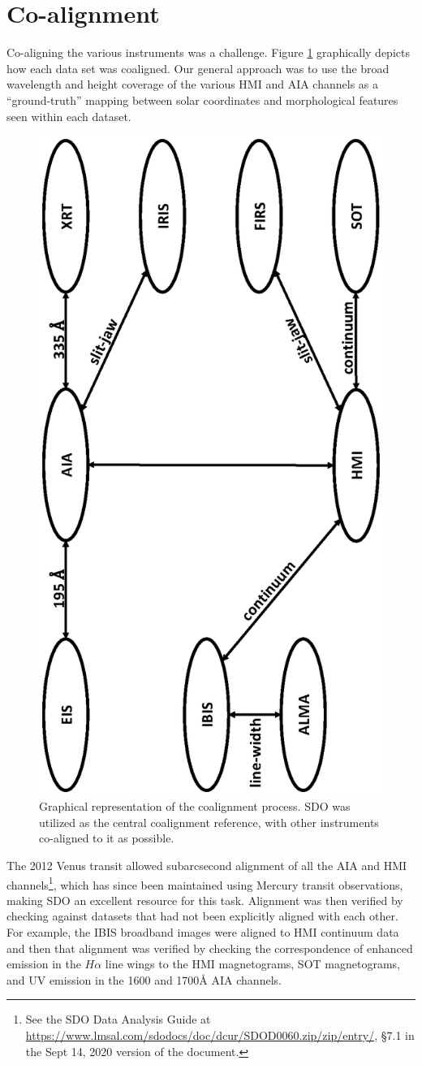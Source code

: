 \documentclass[twocolumn]{aastex62}
\newcommand{\figref}[1]{Figure \ref{#1}}
\newcommand{\halpha}{\ensuremath{H\alpha}}
\begin{document}
\section{Co-alignment} \label{sec:coalign}
Co-aligning the various instruments was a challenge.  \figref{fig:coalign} graphically depicts how each data set was coaligned.
Our general approach was to use the broad wavelength and height coverage of the various HMI and AIA channels as a ``ground-truth'' mapping between solar coordinates and morphological features seen within each dataset.  
\begin{figure}[b]
\centering
\includegraphics[trim=200 100 100 100, clip, width=0.5\linewidth, angle=270]{figures/co-alignment.eps}
\caption{Graphical representation of the coalignment process. SDO was utilized as the central coalignment reference, with other instruments co-aligned to it as possible. }\label{fig:coalign}
\end{figure}
The 2012 Venus transit allowed subarcsecond alignment of all the AIA and HMI channels\footnote{See the SDO Data Analysis Guide at \url{https://www.lmsal.com/sdodocs/doc/dcur/SDOD0060.zip/zip/entry/}, \S{}7.1 in the Sept 14, 2020 version of the document.}, which has since been maintained using Mercury transit observations, making SDO an excellent resource for this task.  
Alignment was then verified by checking against datasets that had not been explicitly aligned with each other.
For example, the IBIS broadband images were aligned to HMI continuum data and then that alignment was verified by checking the correspondence of enhanced emission in the \halpha{} line wings to the HMI magnetograms, SOT magnetograms, and UV emission in the 1600 and 1700\AA{} AIA channels. 
\end{document}
